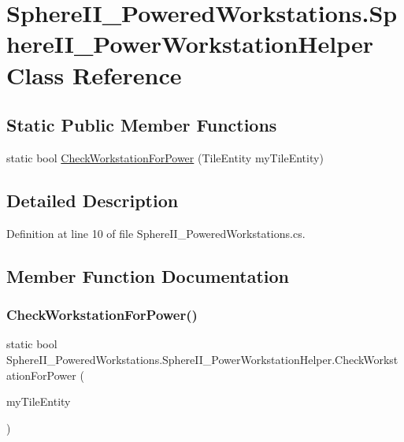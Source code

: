 \hypertarget{class_sphere_i_i___powered_workstations_1_1_sphere_i_i___power_workstation_helper}{}\section{Sphere\+I\+I\+\_\+\+Powered\+Workstations.\+Sphere\+I\+I\+\_\+\+Power\+Workstation\+Helper Class Reference}
\label{class_sphere_i_i___powered_workstations_1_1_sphere_i_i___power_workstation_helper}
\subsection*{Static Public Member Functions}
\begin{DoxyCompactItemize}
\item 
static bool \mbox{\hyperlink{class_sphere_i_i___powered_workstations_1_1_sphere_i_i___power_workstation_helper_aa35d99e3252f2d5d414a87c495abebc7}{Check\+Workstation\+For\+Power}} (Tile\+Entity my\+Tile\+Entity)
\end{DoxyCompactItemize}


\subsection{Detailed Description}


Definition at line 10 of file Sphere\+I\+I\+\_\+\+Powered\+Workstations.\+cs.



\subsection{Member Function Documentation}
\mbox{\label{class_sphere_i_i___powered_workstations_1_1_sphere_i_i___power_workstation_helper_aa35d99e3252f2d5d414a87c495abebc7}} 
\subsubsection{\texorpdfstring{CheckWorkstationForPower()}{CheckWorkstationForPower()}}
{\footnotesize\ttfamily static bool Sphere\+I\+I\+\_\+\+Powered\+Workstations.\+Sphere\+I\+I\+\_\+\+Power\+Workstation\+Helper.\+Check\+Workstation\+For\+Power (\begin{DoxyParamCaption}\item[{Tile\+Entity}]{my\+Tile\+Entity }\end{DoxyParamCaption})\hspace{0.3cm}{\ttfamily [static]}}




